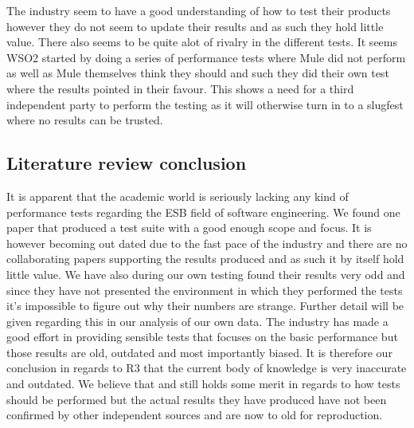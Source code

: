 The industry seem to have a good understanding of how to test their products however they do not seem to update their results and as such they hold little value.
There also seems to be quite alot of rivalry in the different tests. 
It seems WSO2 started by doing a series of performance tests where Mule did not perform as well as Mule themselves think they should and such they did their own test where the results pointed in their favour.
This shows a need for a third independent party to perform the testing as it will otherwise turn in to a slugfest where no results can be trusted. 


\subsection{Literature review conclusion}

It is apparent that the academic world is seriously lacking any kind of performance tests regarding the ESB field of software engineering. 
We found one paper\cite{Sanjay2011} that produced a test suite with a good enough scope and focus. 
It is however becoming out dated due to the fast pace of the industry and there are no collaborating papers supporting the results produced and as such it by itself hold little value. 
We have also during our own testing found their results very odd and since they have not presented the environment in which they performed the tests it's impossible to figure out why their numbers are strange. 
Further detail will be given regarding this in our analysis of our own data. %
The industry has made a good effort in providing sensible tests that focuses on the basic performance but those results are old, outdated and most importantly biased. 
It is therefore our conclusion in regards to R3 that the current body of knowledge is very inaccurate and outdated. 
We believe that \cite{Sanjay2011} and \cite{Perera07,Perera07R2,Perera07R3,mulesoft08}still holds some merit in regards to how tests should be performed but the actual results they have produced have not been confirmed by other independent sources and are now to old for reproduction.
